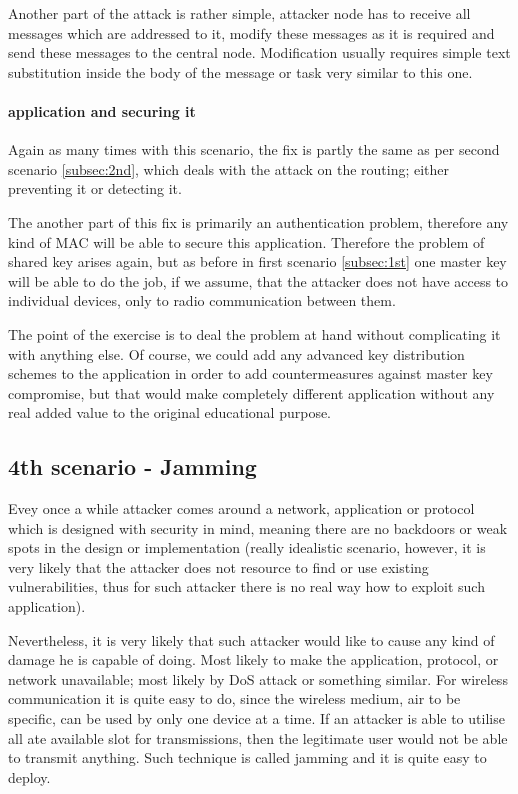 \documentclass[
  print, %
  table,   %
  nolof,     %
  nolot,     %
           oneside
]{fithesis3}
\begin{document}
    Another part of the attack is rather simple, attacker node has to receive all messages which are addressed to it, modify these messages as it is required and send these messages to the central node. Modification usually requires simple text substitution inside the body of the message or task very similar to this one.

    \paragraph{application and securing it}
    Again as many times with this scenario, the fix is partly the same as per second scenario \ref{subsec:2nd}, which deals with the attack on the routing; either preventing it or detecting it.

    The another part of this fix is primarily an authentication problem, therefore any kind of MAC will be able to secure this application. Therefore the problem of shared key arises again, but as before in first scenario \ref{subsec:1st} one master key will be able to do the job, if we assume, that the attacker does not have access to individual devices, only to radio communication between them.

    The point of the exercise is to deal the problem at hand without complicating it with anything else. Of course, we could add any advanced key distribution schemes  %
    to the application in order to add countermeasures against master key compromise, but that would make completely different application without any real added value to the original educational purpose.

    \subsection{4th scenario - Jamming} \label{subsec:4th}
    Evey once a while attacker comes around a network, application or protocol which is designed with security in mind, meaning there are no backdoors or weak spots in the design or implementation (really idealistic scenario, however, it is very likely that the attacker does not resource to find or use existing vulnerabilities, thus for such attacker there is no real way how to exploit such application).

    Nevertheless, it is very likely that such attacker would like to cause any kind of damage he is capable of doing. Most likely to make the application, protocol, or network unavailable; most likely by DoS attack %
    or something similar. For wireless communication it is quite easy to do, since the wireless medium, air to be specific, can be used by only one device at a time. If an attacker is able to utilise all ate available slot for transmissions, then the legitimate user would not be able to transmit anything. Such technique is called jamming and it is quite easy to deploy.
\end{document}
